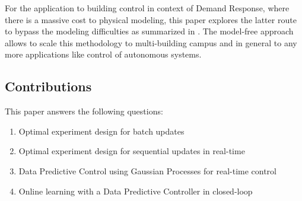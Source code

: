 For the application to building control in context of Demand Response, where there is a massive cost to physical modeling, this paper explores the latter route to bypass the modeling difficulties as summarized in \cite{Sturzenegger2016}. The model-free approach allows to scale this methodology to multi-building campus and in general to any more applications like control of autonomous systems.

\subsection{Contributions}


This paper answers the following questions:
\begin{enumerate}
	\item Optimal experiment design for batch updates
	\item Optimal experiment design for sequential updates in real-time
	\item Data Predictive Control using Gaussian Processes for real-time control
	\item Online learning with a Data Predictive Controller in closed-loop
\end{enumerate}



